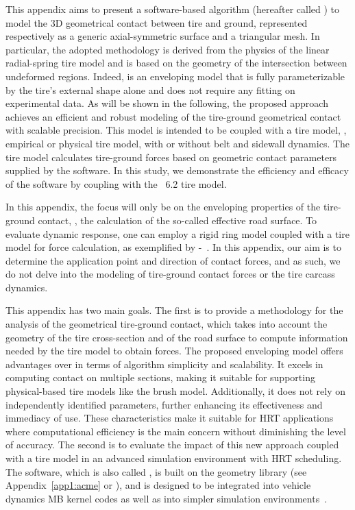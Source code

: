 This appendix aims to present a software-based algorithm (hereafter called \Enve{}) to model the 3D geometrical contact between tire and ground, represented respectively as a generic axial-symmetric surface and a triangular mesh. In particular, the adopted methodology is derived from the physics of the linear radial-spring tire model and is based on the geometry of the intersection between undeformed regions. Indeed, \Enve{} is an enveloping model that is fully parameterizable by the tire's external shape alone and does not require any fitting on experimental data. As will be shown in the following, the proposed approach achieves an efficient and robust modeling of the tire-ground geometrical contact with scalable precision. This model is intended to be coupled with a tire model, \ie{}, empirical or physical tire model, with or without belt and sidewall dynamics. The tire model calculates tire-ground forces based on geometric contact parameters supplied by the \Enve{} software. In this study, we demonstrate the efficiency and efficacy of the software by coupling \Enve{} with the \MagicFormulae{}~6.2 tire model.
%
\begin{remark}
  In this appendix, the focus will only be on the enveloping properties of the tire-ground contact, \ie{}, the calculation of the so-called effective road surface. To evaluate dynamic response, one can employ a rigid ring model coupled with a tire model for force calculation, as exemplified by \MagicFormulae{}-\Swift{}~\cite{pacejka2012tire, schmeitz2004semiempirical}. In this appendix, our aim is to determine the application point and direction of contact forces, and as such, we do not delve into the modeling of tire-ground contact forces or the tire carcass dynamics.
\end{remark}
%
This appendix has two main goals. The first is to provide a methodology for the analysis of the geometrical tire-ground contact, which takes into account the geometry of the tire cross-section and of the road surface to compute information needed by the tire model to obtain forces. The proposed enveloping model offers advantages over \Swift{} in terms of algorithm simplicity and scalability. It excels in computing contact on multiple sections, making it suitable for supporting physical-based tire models like the brush model. Additionally, it does not rely on independently identified parameters, further enhancing its effectiveness and immediacy of use. These characteristics make it suitable for \ac{HRT} applications where computational efficiency is the main concern without diminishing the level of accuracy. The second is to evaluate the impact of this new approach coupled with a tire model in an advanced simulation environment with \ac{HRT} scheduling. The software, which is also called \Enve{}, is built on the \Acme{} geometry library (see Appendix~\ref{app1:acme} or \citet{stocco2021acme}), and is designed to be integrated into vehicle dynamics \ac{MB} kernel codes as well as into simpler simulation environments~\cite{piccinini2022predictive, piccinini2023physics}.

